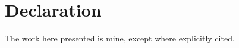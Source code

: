 \chapter*{Declaration}
The work here presented is mine, except where explicitly cited.


\newpage





